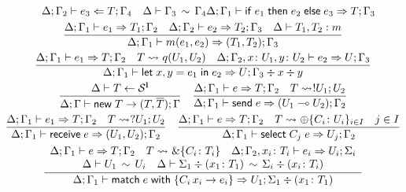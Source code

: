 \begin{figure}[h!]
\begin{gather*}
{      \quad
      \algtypein[\kindEnv;\varEnv_2]{e_3}{T}{\varEnv_4}
      \quad
      \ctxequiv{\varEnv_3}{\varEnv_4}
    }{
      \algtypeout[\kindEnv;\varEnv_1]{\conditionale{e_1}{e_2}{e_3}}{T}{\varEnv_3}
    }
    \\
    \frac{
      \algtypeout[\kindEnv ; \varEnv_1]{e_1}{T_1}{\varEnv_2}
      \quad
      \algtypeout[\kindEnv ; \varEnv_2]{e_2}{T_2}{\varEnv_3}
      \quad
      \isType{T_1,T_2}{m}
    }{
      \algtypeout[\kindEnv ; \varEnv_1]{m(e_1, e_2)}{(T_1,T_2)}{\varEnv_3}
    }
    \\
    \frac{
      \algtypeout[\kindEnv ; \varEnv_1]{e_1}{T}{\varEnv_2}
      \quad
      T \Extract{} q(U_1, U_2)
      \quad
      \algtypeout[\kindEnv; \varEnv_2, x\colon U_1, y\colon U_2]{e_2}{U}{\varEnv_3}
    }{
      \algtypeout[\kindEnv;
      \varEnv_1]{\binlete{x}{y}{e_1}{e_2}}{U}{\varEnv_3} \div x \div y
    }
    \\
    \frac{
      \kindEnv \Alg T \leftarrow \kinds^{\Lin}
    }{
      \kindEnv;\varEnv \Alg \newe{T} \rightarrow (T, \dual{T}); \varEnv
    }
    \quad
    \frac{
      \algtypeout[\kindEnv;\varEnv_1]{e}{T}{\varEnv_2}
      \quad
      T\Extract{} !U_1;U_2
    }{
      \algtypeout[\kindEnv;\varEnv_1]{\sendce e}{(U_1\multimap U_2)}{\varEnv_2}
    }
    \\
    \frac{
      \algtypeout[\kindEnv;\varEnv_1]{e_1}{T}{\varEnv_2}
      \quad T
      \Extract{} ?U_1;U_2
    }{
      \algtypeout[\kindEnv;\varEnv_1]{\recve e}{(U_1,U_2)}{\varEnv_2}
    }
    \quad
    \frac{
      \algtypeout[\kindEnv;\varEnv_1]{e}{T}{\varEnv_2}
      \quad
      T \Extract{}\oplus\{C_i\colon U_i\}_{i\in I}
      \quad
      j \in I
    }{
      \algtypeout[\kindEnv;\varEnv_1]{\selecte{C_j}{e}}{U_j}{\varEnv_2}
    }
    \\
    \frac{
      \begin{array}{c}
      \algtypeout[\kindEnv;\varEnv_1]{e}{T}{\varEnv_2}
      \quad
      T \Extract{} \&\{C_i\colon T_i\}
      \quad 
      \algtypeout[\kindEnv;\varEnv_2, x_i\colon T_i]{e_i}{U_i}{\Sigma_i}
      \\
      \typeequiv{U_1}{U_i}
      \quad
      \ctxequiv{\Sigma_1 \div (x_1\colon T_1)}{\Sigma_i \div (x_i\colon T_i)} 
      \end{array}
    }{
      \algtypeout[\kindEnv;\varEnv_1]{\matche{e}{\{C_i\,x_i
          \rightarrow e_i\}}}{U_1}{\Sigma_1 \div (x_1\colon T_1)}
    }
  \\

\end{gather*}
\end{figure}
